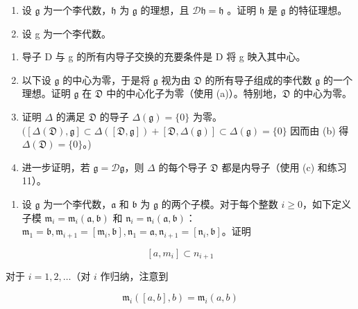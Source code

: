 \begin{enumerate}
\def\labelenumi{\arabic{enumi}.}
\setcounter{enumi}{10}
\item
  设 \(\mathfrak{g}\) 为一个李代数，\(\mathfrak{h}\) 为 \(\mathfrak{g}\) 的理想，且 \(\mathcal{D}\mathfrak{h} = \mathfrak{h}\) 。证明 \(\mathfrak{h}\) 是 \(\mathfrak{g}\) 的特征理想。
\item
  设 g 为一个李代数。
\end{enumerate}

\begin{enumerate}
\def\labelenumi{(\alph{enumi})}
\item
  导子 D 与 g 的所有内导子交换的充要条件是 D 将 g 映入其中心。
\item
  以下设 \(\mathfrak{g}\) 的中心为零，于是将 \(\mathfrak{g}\) 视为由 \(\mathfrak{D}\) 的所有导子组成的李代数 \(\mathfrak{g}\) 的一个理想。证明 \(\mathfrak{g}\) 在 \(\mathfrak{D}\) 中的中心化子为零（使用 (a)）。特别地，\(\mathfrak{D}\) 的中心为零。
\item
  证明 \(\Delta\) 的满足 \(\mathfrak{D}\) 的导子 \(\Delta(\mathfrak{g}) = \{0\}\) 为零。 \(([\Delta(\mathfrak{D}),\mathfrak{g}]\subset \Delta([\mathfrak{D},\mathfrak{g}]) + [\mathfrak{D},\Delta(\mathfrak{g})]\subset \Delta(\mathfrak{g}) = \{0\}\) 因而由 (b) 得 \(\Delta(\mathfrak{D}) = \{0\}\)。)
\item
  进一步证明，若 \(\mathfrak{g} = \mathcal{D}\mathfrak{g}\)，则 \(\Delta\) 的每个导子 \(\mathfrak{D}\) 都是内导子（使用 (c) 和练习 11）。
\end{enumerate}

\begin{enumerate}
\def\labelenumi{\arabic{enumi}.}
\setcounter{enumi}{12}
\tightlist
\item
  设 \(\mathfrak{g}\) 为一个李代数，\(\mathfrak{a}\) 和 \(\mathfrak{b}\) 为 \(\mathfrak{g}\) 的两个子模。对于每个整数 \(i \geqslant 0\)，如下定义子模 \(\mathfrak{m}_i = \mathfrak{m}_i(\mathfrak{a},\mathfrak{b})\) 和 \(\mathfrak{n}_i = \mathfrak{n}_i(\mathfrak{a},\mathfrak{b})\)：\(\mathfrak{m}_1 = \mathfrak{b}, \mathfrak{m}_{i+1} = [\mathfrak{m}_i,\mathfrak{b}], \mathfrak{n}_1 = \mathfrak{a}, \mathfrak{n}_{i+1} = [\mathfrak{n}_i,\mathfrak{b}]\)。证明
\end{enumerate}

\[
[ a, m _ {i} ] \subset n _ {i + 1}
\]

对于 \(i = 1,2,\ldots\)（对 \(i\) 作归纳，注意到

\[
\mathfrak {m} _ {i} ([ a, b ], b) = \mathfrak {m} _ {i} (a, b)
\]

